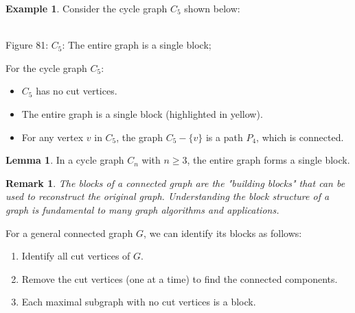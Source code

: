 \documentclass{article}
\newtheorem{remark}{Remark}
\theoremstyle{definition}
\newtheorem{example}{Example}
\newtheorem{lemma}{Lemma}
\begin{document}
\begin{example}
Consider the cycle graph $C_5$ shown below:

\begin{center}
\\
\small Figure 81: {$C_5$: The entire graph is a single block};

For the cycle graph $C_5$:
\begin{itemize}
    \item $C_5$ has no cut vertices.
    \item The entire graph is a single block (highlighted in yellow).
    \item For any vertex $v$ in $C_5$, the graph $C_5 - \{v\}$ is a path $P_4$, which is connected.
\end{itemize}

\begin{lemma}
In a cycle graph $C_n$ with $n \geq 3$, the entire graph forms a single block.
\end{lemma}

\begin{remark}
The blocks of a connected graph are the "building blocks" that can be used to reconstruct the original graph. Understanding the block structure of a graph is fundamental to many graph algorithms and applications.
\end{remark}

For a general connected graph $G$, we can identify its blocks as follows:
\begin{enumerate}
    \item Identify all cut vertices of $G$.
    \item Remove the cut vertices (one at a time) to find the connected components.
    \item Each maximal subgraph with no cut vertices is a block.
\end{enumerate}
\end{center}
\end{example}
\pagebreak
\newpage
\end{document}
